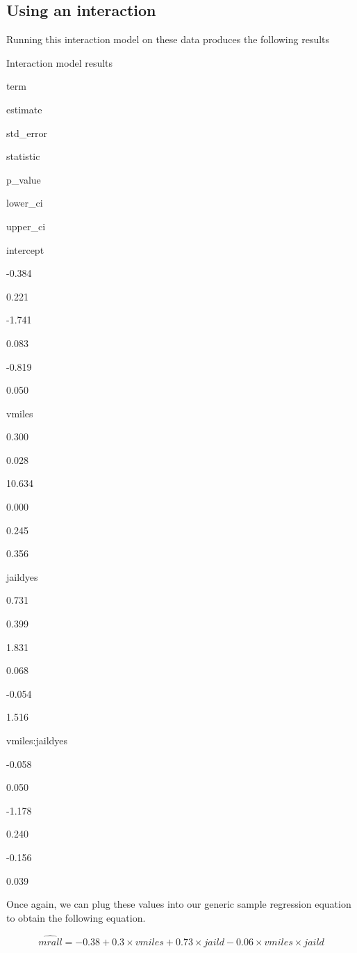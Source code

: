 \documentclass[
]{book}
\begin{document}
\hypertarget{using-an-interaction}{%
\subsection{Using an interaction}\label{using-an-interaction}}

Running this interaction model on these data produces the following results

\label{tab:interactionmod}Interaction model results

term

estimate

std\_error

statistic

p\_value

lower\_ci

upper\_ci

intercept

-0.384

0.221

-1.741

0.083

-0.819

0.050

vmiles

0.300

0.028

10.634

0.000

0.245

0.356

jaildyes

0.731

0.399

1.831

0.068

-0.054

1.516

vmiles:jaildyes

-0.058

0.050

-1.178

0.240

-0.156

0.039

Once again, we can plug these values into our generic sample regression equation to obtain the following equation.

\begin{equation}
\hat{mrall} = -0.38 + 0.3\times vmiles + 0.73\times jaild - 0.06\times vmiles \times jaild
\label{eq:interactionex}
\end{equation}
\end{document}
